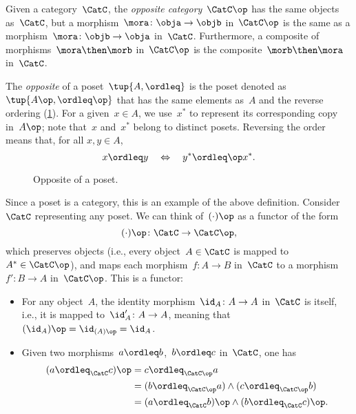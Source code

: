 \begin{ctdefinition}
\label{def:oppositecat}
Given a category~$\CatC$, the \emph{opposite category}~$\CatC\op$ has the same objects as~$\CatC$, but a morphism~$\mora\colon \obja\to \objb$ in~$\CatC\op$ is the same as a morphism~$\mora\colon \objb\to \obja$ in~$\CatC$. Furthermore, a composite of morphisms~$\mora \then \morb$ in~$\CatC\op$ is the composite~$\morb\then \mora$ in~$\CatC$.
\end{ctdefinition}

\begin{example}
    The \emph{opposite} of a  poset~$\tup{A, \ordleq} $ is the poset denoted as~$\tup{A\op, \ordleq\op}$ that has the same elements as~$A$ and the reverse ordering (\cref{fig:opposite}).
    For a given~$x \in A$, we use~$x^*$ to represent its corresponding copy in~$A\op$;
    note that~$x$ and~$x^*$ belong to distinct posets.
    Reversing the order means that, for all $x,y\in A$,
    \begin{equation}
        x \ordleq y \quad \Leftrightarrow \quad y^* \ordleq\op x^*.
    \end{equation}
    \begin{figure}[tbh]
   \centering
   \caption{Opposite of a poset.\label{fig:opposite}}
\end{figure}
Since a poset is a category, this is an example of the above definition. Consider~$\CatC$ representing any poset. We can think of~$(\cdot)\op$ as a functor of the form
\begin{equation}
    (\cdot)\op\colon \CatC \to \CatC\op,
\end{equation}
which preserves objects (i.e., every object~$A \in \CatC$ is mapped to~$A^*\in \CatC\op$), and maps each morphism~$f\colon A\to B$ in~$\CatC$ to a morphism~$f'\colon B\to A$ in~$\CatC\op$. This is a functor:
\begin{itemize}
    \item For any object~$A$, the identity morphism~$\id_A\colon A\to A$ in~$\CatC$ is itself, i.e., it is mapped to~$\id_A'\colon A\to A$, meaning that~$(\id_A)\op=\id_{(A)\op}=\id_A$.
    \item Given two morphisms~$a\ordleq b$,~$b\ordleq c$ in~$\CatC$, one has
    \begin{equation}
        \begin{aligned}
        (a\ordleq_{\CatC} c)\op &=c\ordleq_{\CatC\op} a\\
        &=(b\ordleq_{\CatC\op} a)\wedge (c\ordleq_{\CatC\op}b)\\
        &=(a\ordleq_{\CatC} b)\op \wedge (b\ordleq_{\CatC} c)\op.
        \end{aligned}
    \end{equation}
\end{itemize}
\end{example}

